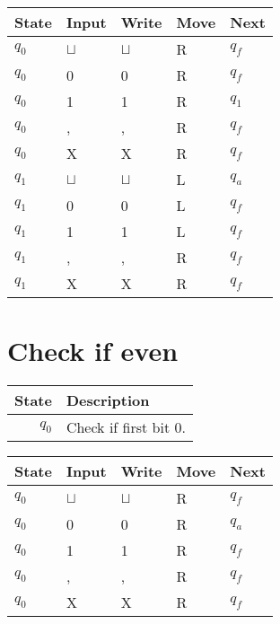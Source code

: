 \documentclass[a4paper, hidelinks, twocolumn, 9pt]{article}
\newcommand{\blm}{\sqcup}
\newcommand{\bl}{\(\blm\)}
\begin{document}
  \begin{center}
    \begin{tabular}{x{1cm}x{1cm}x{1cm}x{1cm}x{1cm}}
      \toprule
      State & Input & Write & Move & Next \\
      \midrule
      \(q_0\) & \bl & \bl & R & \(q_f\) \\
      \(q_0\) &   0 &   0 & R & \(q_f\) \\
      \(q_0\) &   1 &   1 & R & \(q_1\) \\
      \(q_0\) &   , &   , & R & \(q_f\) \\
      \(q_0\) &   X &   X & R & \(q_f\) \\
      \midrule
      \(q_1\) & \bl & \bl & L & \(q_a\) \\
      \(q_1\) &   0 &   0 & L & \(q_f\) \\
      \(q_1\) &   1 &   1 & L & \(q_f\) \\
      \(q_1\) &   , &   , & R & \(q_f\) \\
      \(q_1\) &   X &   X & R & \(q_f\) \\
      \bottomrule
    \end{tabular}
  \end{center}

  \section*{Check if even}

  \begin{tabular}{rl}
    \textbf{State} & \textbf{Description} \\
    \midrule
    \( q_0 \) & Check if first bit 0. \\
  \end{tabular}

  \begin{center}
    \begin{tabular}{x{1cm}x{1cm}x{1cm}x{1cm}x{1cm}}
      \toprule
      State & Input & Write & Move & Next \\
      \midrule
      \(q_0\) & \bl & \bl & R & \(q_f\) \\
      \(q_0\) &   0 &   0 & R & \(q_a\) \\
      \(q_0\) &   1 &   1 & R & \(q_f\) \\
      \(q_0\) &   , &   , & R & \(q_f\) \\
      \(q_0\) &   X &   X & R & \(q_f\) \\
      \bottomrule
    \end{tabular}
  \end{center}

\end{document}
